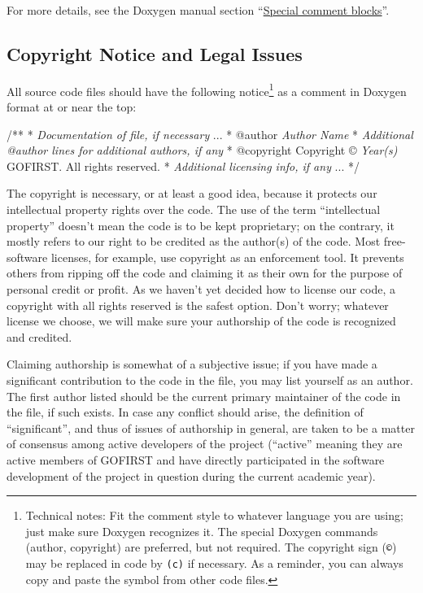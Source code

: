 \documentclass[12pt]{article}
\newcommand{\code}[1]{\texttt{#1}}
\newcommand{\toreplace}[1]{\emph{#1}}
\begin{document}
For more details, see the Doxygen manual \cite{doxyguide} section ``\href{http://www.stack.nl/~dimitri/doxygen/manual/docblocks.html#specialblock}{Special comment blocks}''.
\subsection{Copyright Notice and Legal Issues}
All source code files should have the following notice\footnote{Technical notes: Fit the comment style to whatever language you are using; just make sure Doxygen recognizes it. The special Doxygen commands (author, copyright) are preferred, but not required. The copyright sign (\code{©}) may be replaced in code by \code{(c)} if necessary. As a reminder, you can always copy and paste the symbol from other code files.}
as a comment in Doxygen format at or near the top:
\begin{codeex}[commandchars=\\\{\}]
/**
 * \toreplace{Documentation of file, if necessary}
 ...
 * @author \toreplace{Author Name}
 * \toreplace{Additional @author lines for additional authors, if any}
 * @copyright Copyright © \toreplace{Year(s)} GOFIRST. All rights reserved.
 * \toreplace{Additional licensing info, if any}
 ...
 */
\end{codeex}
The copyright is necessary, or at least a good idea, because it protects our intellectual property rights over the code. The use of the term ``intellectual property'' doesn't mean the code is to be kept proprietary; on the contrary, it mostly refers to our right to be credited as the author(s) of the code. Most free-software licenses, for example, use copyright as an enforcement tool. It prevents others from ripping off the code and claiming it as their own for the purpose of personal credit or profit. As we haven't yet decided how to license our code, a copyright with all rights reserved is the safest option. Don't worry; whatever license we choose, we will make sure your authorship of the code is recognized and credited.

Claiming authorship is somewhat of a subjective issue; if you have made a significant contribution to the code in the file, you may list yourself as an author. The first author listed should be the current primary maintainer of the code in the file, if such exists. In case any conflict should arise, the definition of ``significant'', and thus of issues of authorship in general, are taken to be a matter of consensus among active developers of the project (``active'' meaning they are active members of GOFIRST and have directly participated in the software development of the project in question during the current academic year).
\end{document}
